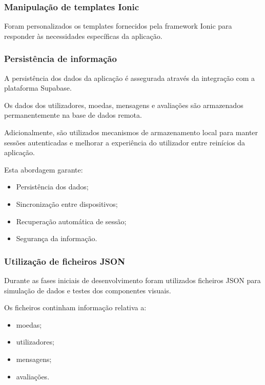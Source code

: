\documentclass[12pt,a4paper]{article}
\begin{document}
\subsubsection{Manipulação de templates Ionic}

Foram personalizados os templates fornecidos pela framework Ionic para responder às necessidades específicas da aplicação.

\subsubsection{Persistência de informação}

A persistência dos dados da aplicação é assegurada através da integração com a plataforma Supabase.

Os dados dos utilizadores, moedas, mensagens e avaliações são armazenados permanentemente na base de dados remota.

Adicionalmente, são utilizados mecanismos de armazenamento local para manter sessões autenticadas e melhorar a experiência do utilizador entre reinícios da aplicação.

Esta abordagem garante:

\begin{itemize}
\setlength{\itemsep}{0.15em}
\item Persistência dos dados;
\item Sincronização entre dispositivos;
\item Recuperação automática de sessão;
\item Segurança da informação.
\end{itemize}

\subsubsection{Utilização de ficheiros JSON}

Durante as fases iniciais de desenvolvimento foram utilizados ficheiros JSON para simulação de dados e testes dos componentes visuais.

Os ficheiros continham informação relativa a:

\begin{itemize}
\setlength{\itemsep}{0.15em}
\item moedas;
\item utilizadores;
\item mensagens;
\item avaliações.
\end{itemize}
\end{document}

